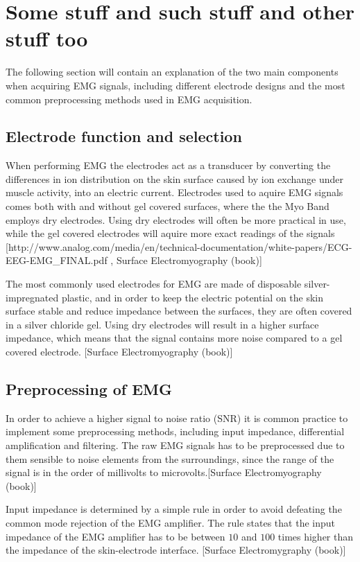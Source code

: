 \section{Some stuff and such stuff and other stuff too}

The following section will contain an explanation of the two main components when acquiring EMG signals, including different electrode designs and the most common preprocessing methods used in EMG acquisition.

\subsection{Electrode function and selection}

When performing EMG the electrodes act as a transducer by converting the differences in ion distribution on the skin surface caused by ion exchange under muscle activity, into an electric current. Electrodes used to aquire EMG signals comes both with and without gel covered surfaces, where the the Myo Band employs dry electrodes. Using dry electrodes will often be more practical in use, while the gel covered electrodes will aquire more exact readings of the signals [http://www.analog.com/media/en/technical-documentation/white-papers/ECG-EEG-EMG_FINAL.pdf , Surface Electromyography (book)]

The most commonly used electrodes for EMG are made of disposable silver-impregnated plastic, and in order to keep the electric potential on the skin surface stable and reduce impedance between the surfaces, they are often covered in a silver chloride gel. Using dry electrodes will result in  a higher surface impedance, which means that the signal contains more noise compared to a gel covered electrode. [Surface Electromyography (book)]

\subsection{Preprocessing of EMG}

In order to achieve a higher signal to noise ratio (SNR) it is common practice to implement some preprocessing methods, including input impedance, differential amplification and filtering. The raw EMG signals has to be preprocessed due to them sensible to noise elements from the surroundings, since the range of the signal is in the order of millivolts to microvolts.[Surface Electromyography (book)]

Input impedance is determined by a simple rule in order to avoid defeating the common mode rejection of the EMG amplifier. The rule states that the input impedance of the EMG amplifier has to be between $10$ and $100$ times higher than the impedance of the skin-electrode interface. [Surface Electromygraphy (book)]

